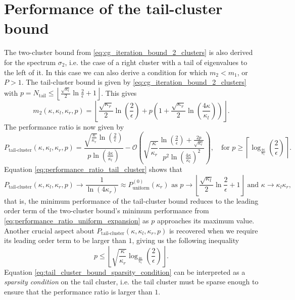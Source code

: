 \section{Performance of the tail-cluster bound}\label{sec:tail_cluster_bound_performance}
The two-cluster bound from \cref{eq:cg_iteration_bound_2_clusters} is also derived for the spectrum $\sigma_2$, i.e. the case of a right cluster with a tail of eigenvalues to the left of it. In this case we can also derive a condition for which $m_2 < m_1$, or $P > 1$. The tail-cluster bound is given by \cref{eq:cg_iteration_bound_2_clusters} with $p = N_{\text{tail}} \leq \left\lfloor\frac{\sqrt{\kappa_l}}{2}\ln{\frac{2}{\epsilon}} + 1 \right\rfloor $. This gives
\[
    m_2(\kappa, \kappa_l, \kappa_r, p) = \left\lfloor
    \frac{\sqrt{\kappa_r}}{2}\ln\left(\frac{2}{\epsilon}\right)
    + p \left(
    1 + \frac{\sqrt{\kappa_r}}{2}\ln\left(\frac{4\kappa}{\kappa_l}\right)
    \right)
    \right\rfloor.
\]
The performance ratio is now given by
\begin{equation}
    P_{\text{tail-cluster}}(\kappa, \kappa_l, \kappa_r, p) = \frac{\sqrt{\frac{\kappa}{\kappa_r}}\ln\left(\frac{2}{\epsilon}\right)}{p\ln\left(\frac{4\kappa}{\kappa_l}\right)} - \mathcal{O}\left(\sqrt{\frac{\kappa}{\kappa_r}}\frac{\ln\left(\frac{2}{\epsilon}\right) + \frac{2p}{\sqrt{\kappa_r}}}{p^2\ln\left(\frac{4\kappa}{\kappa_l}\right)^2}\right), \quad \text{for } p \geq \left\lceil\log_{\frac{4\kappa}{\kappa_l}}\left(\frac{2}{\epsilon}\right)\right\rceil.
    \label{eq:performance_ratio_tail_cluster}
\end{equation}
Equation \ref{eq:performance_ratio_tail_cluster} shows that
\[
    P_{\text{tail-cluster}}(\kappa, \kappa_l, \kappa_r, p) \longrightarrow \frac{1}{\ln(4\kappa_r)} \approx P^{(0)}_{\text{uniform}}(\kappa_r) \text{ as } p \to \left\lfloor\frac{\sqrt{\kappa_l}}{2}\ln{\frac{2}{\epsilon}} + 1 \right\rfloor \text{ and } \kappa \to \kappa_l\kappa_r,
\]
that is, the minimum performance of the tail-cluster bound reduces to the leading order term of the two-cluster bound's minimum performance from \cref{eq:performance_ratio_uniform_expansion} as $p$ approaches its maximum value. Another crucial aspect about $P_{\text{tail-cluster}}(\kappa, \kappa_l, \kappa_r, p)$ is recovered when we require its leading order term to be larger than $1$, giving us the following inequality
\begin{equation}
    p \leq \left\lfloor\sqrt{\frac{\kappa}{\kappa_r}}\log_{\frac{4\kappa}{\kappa_l}}\left(\frac{2}{\epsilon}\right)\right\rfloor.
    \label{eq:tail_cluster_bound_sparsity_condition}
\end{equation}
Equation \ref{eq:tail_cluster_bound_sparsity_condition} can be interpreted as a \textit{sparsity condition} on the tail cluster, i.e. the tail cluster must be sparse enough to ensure that the performance ratio is larger than $1$.


